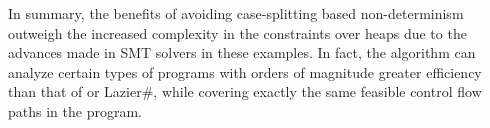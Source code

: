 In summary, the benefits of avoiding case-splitting based
non-determinism outweigh the increased complexity in the constraints
over heaps due to the advances made in SMT solvers in these
examples. In fact, the \symtxt{} algorithm can analyze certain types
of programs with orders of magnitude greater efficiency than that of
\gsetxt{} or Lazier\#, while covering exactly the same feasible
control flow paths in the program.



